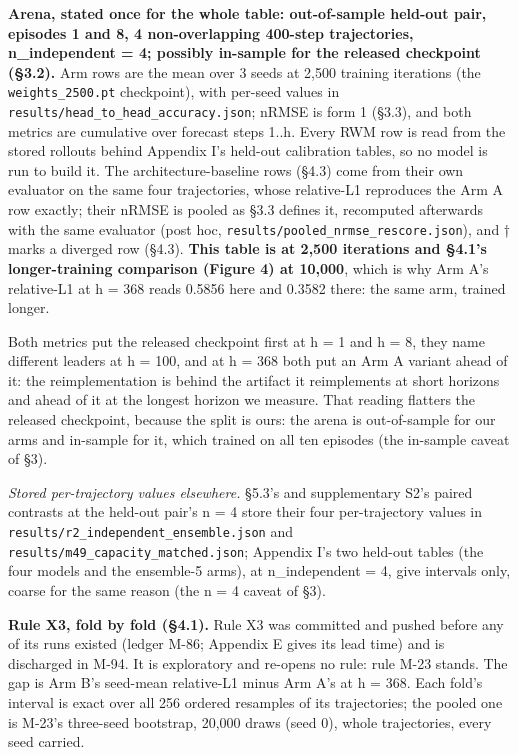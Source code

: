 \documentclass[10pt]{article}
\begin{document}
\textbf{Arena, stated once for the whole table: out-of-sample held-out pair, episodes 1 and 8, 4 non-overlapping 400-step trajectories, n\_independent = 4; possibly in-sample for the released checkpoint (\S{}3.2).} Arm rows are the mean over 3 seeds at 2,500 training iterations (the \texttt{weights\_2500.pt} checkpoint), with per-seed values in \texttt{results/\allowbreak{}head\_\allowbreak{}to\_\allowbreak{}head\_\allowbreak{}accuracy\allowbreak{}.json}; nRMSE is form 1 (\S{}3.3), and both metrics are cumulative over forecast steps 1..h. Every RWM row is read from the stored rollouts behind Appendix I's held-out calibration tables, so no model is run to build it. The architecture-baseline rows (\S{}4.3) come from their own evaluator on the same four trajectories, whose relative-L1 reproduces the Arm A row exactly; their nRMSE is pooled as \S{}3.3 defines it, recomputed afterwards with the same evaluator (post hoc, \texttt{results/\allowbreak{}pooled\_\allowbreak{}nrmse\_\allowbreak{}rescore\allowbreak{}.json}), and † marks a diverged row (\S{}4.3). \textbf{This table is at 2,500 iterations and \S{}4.1's longer-training comparison (Figure 4) at 10,000}, which is why Arm A's relative-L1 at h = 368 reads 0.5856 here and 0.3582 there: the same arm, trained longer.

Both metrics put the released checkpoint first at h = 1 and h = 8, they name different leaders at h = 100, and at h = 368 both put an Arm A variant ahead of it: the reimplementation is behind the artifact it reimplements at short horizons and ahead of it at the longest horizon we measure. That reading flatters the released checkpoint, because the split is ours: the arena is out-of-sample for our arms and in-sample for it, which trained on all ten episodes (the in-sample caveat of \S{}3).

\emph{Stored per-trajectory values elsewhere.} \S{}5.3's and supplementary S2's paired contrasts at the held-out pair's n = 4 store their four per-trajectory values in \texttt{results/\allowbreak{}r2\_\allowbreak{}independent\_\allowbreak{}ensemble\allowbreak{}.json} and \texttt{results/\allowbreak{}m49\_\allowbreak{}capacity\_\allowbreak{}matched\allowbreak{}.json}; Appendix I's two held-out tables (the four models and the ensemble-5 arms), at n\_independent = 4, give intervals only, coarse for the same reason (the n = 4 caveat of \S{}3).

\textbf{Rule X3, fold by fold (\S{}4.1).} Rule X3 was committed and pushed before any of its runs existed (ledger M-86; Appendix E gives its lead time) and is discharged in M-94. It is exploratory and re-opens no rule: rule M-23 stands. The gap is Arm B's seed-mean relative-L1 minus Arm A's at h = 368. Each fold's interval is exact over all 256 ordered resamples of its trajectories; the pooled one is M-23's three-seed bootstrap, 20,000 draws (seed 0), whole trajectories, every seed carried.
\end{document}
